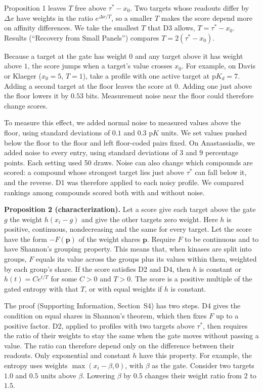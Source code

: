 Proposition 1 leaves $T$ free above $\tau^* - x_0$. Two targets whose readouts
differ by $\Delta x$ have weights in the ratio $e^{\Delta x/T}$, so a smaller
$T$ makes the score depend more on affinity differences. We take the smallest
$T$ that D3 allows, $T = \tau^* - x_0$. Results (``Recovery from Small Panels'')
compares $T = 2(\tau^* - x_0)$.

Because a target at the gate has weight $0$ and any target above it has weight
above $1$, the score jumps when a target's value crosses $x_0$. For example,
on Davis or Klaeger ($x_0 = 5$, $T = 1$), take a profile with one active target
at $\mathrm{p}K_d = 7$. Adding a second target at the floor leaves the score
at $0$. Adding one just above the floor lowers it by $0.53$ bits. Measurement
noise near the floor could therefore change scores.

To measure this effect, we added normal noise to measured values above the
floor, using standard deviations of $0.1$ and $0.3$ $\mathrm{p}K$ units. We
set values pushed below the floor to the floor and left floor-coded pairs
fixed. On Anastassiadis, we added noise to every entry, using standard
deviations of $3$ and $9$ percentage points. Each setting used 50 draws.
Noise can also change which compounds are scored: a compound whose strongest
target lies just above $\tau^*$ can fall below it, and the reverse. D1 was
therefore applied to each noisy profile. We compared rankings among compounds
scored both with and without noise.

\textbf{Proposition 2 (characterization).} Let a score give each target above
the gate $g$ the weight $h(x_i - g)$ and give the other targets zero weight.
Here $h$ is positive, continuous, nondecreasing and the same for every target.
Let the score have the form $-F(\mathbf{p})$ of the weight shares
$\mathbf{p}$. Require $F$ to be continuous and to have Shannon's grouping
property\cite{Shannon1948}. This means that, when kinases are split into
groups, $F$ equals its value across the groups plus its values within them,
weighted by each group's share. If the score satisfies D2 and D4, then $h$ is
constant or $h(t) = C e^{t/T}$ for some $C > 0$ and $T > 0$. The score is a
positive multiple of the gated entropy with that $T$, or with equal weights
if $h$ is constant.

The proof (Supporting Information, Section~S4) has two steps. D4 gives the
condition on equal shares in Shannon's theorem, which then fixes $F$ up to a
positive factor. D2, applied to profiles with two targets above $\tau^*$,
then requires the ratio of their weights to stay the same when the gate moves
without passing a value. The ratio can therefore depend only on the
difference between their readouts. Only exponential and constant $h$ have
this property. For example, the entropy uses weights $\max(x_i - \beta, 0)$, with
$\beta$ as the gate. Consider two targets $1.0$ and $0.5$ units above $\beta$.
Lowering $\beta$ by $0.5$ changes their weight ratio from $2$ to $1.5$.

